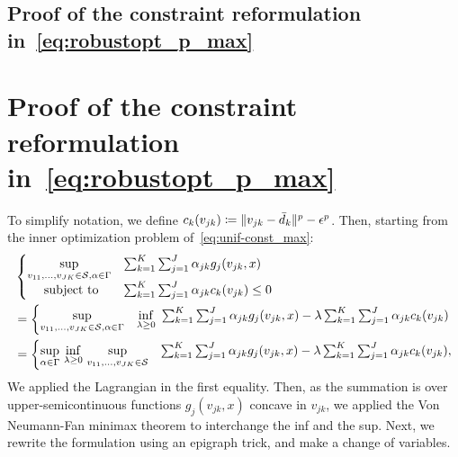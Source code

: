 \documentclass[12pt]{article}
\theoremstyle{thmstyleone}%
\theoremstyle{thmstyletwo}%
\theoremstyle{thmstylethree}%
\newcommand{\reviewChanges}{}
\begin{document}
\begin{appendices}
\ifpreprint
\subsection{Proof of the constraint reformulation in~\eqref{eq:robustopt_p_max}}
\else
\section{Proof of the constraint reformulation in~\eqref{eq:robustopt_p_max}}
\fi

\label{app:dual_form_max}
\reviewChanges{
To simplify notation, we define $c_k(v_{jk}) \coloneqq   \| v_{jk} - \bar{d}_k \|^p - \epsilon^p$. Then, starting from the inner optimization problem of~\eqref{eq:unif-const_max}:
\begin{equation*}
	\begin{aligned}
& \begin{cases}
	\underset{v_{11}, \dots, v_{JK} \in \mathcal{S}, \alpha \in \Gamma}{\sup} &\sum_{k=1}^K \sum_{j=1}^J \alpha_{jk} g_j(v_{jk}, x) \\
	\mbox{~~~~subject to} & \sum_{k=1} ^K \sum_{j=1}^J \alpha_{jk} c_k(v_{jk}) \le 0
\end{cases}\\
&=\begin{cases}
	\underset{v_{11}, \dots, v_{JK} \in \mathcal{S}, \alpha \in \Gamma}{\sup} & \underset{\lambda \geq 0}{\inf}~\sum_{k=1}^K \sum_{j=1}^J \alpha_{jk} g_j(v_{jk}, x) - \lambda\sum_{k=1} ^K \sum_{j=1}^J \alpha_{jk} c_k(v_{jk})\\
\end{cases}\\
&=\begin{cases}
	\underset{\alpha \in \Gamma}{\sup}~\underset{\lambda \geq 0}{\inf}~\underset{v_{11}, \dots, v_{JK} \in \mathcal{S}}{\sup} &\sum_{k=1}^K \sum_{j=1}^J \alpha_{jk} g_j(v_{jk}, x) - \lambda\sum_{k=1} ^K \sum_{j=1}^J \alpha_{jk} c_k(v_{jk}),\\
\end{cases}\\
\end{aligned}
\end{equation*}
We applied the Lagrangian in the first equality. Then, as the summation is over upper-semicontinuous functions $g_j(v_{jk},x)$ concave in $v_{jk}$, we applied the Von Neumann-Fan minimax theorem to interchange the inf and the sup. Next, we rewrite the formulation using an epigraph trick, and make a change of variables. 
\begin{equation*}
	\begin{aligned}

\end{aligned}
\end{equation*}}
\end{appendices}
\end{document}
